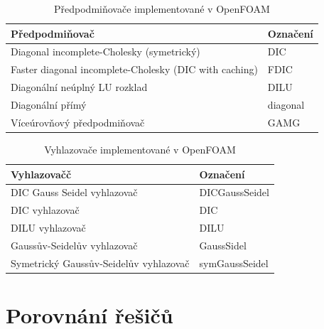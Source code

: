 \documentclass[a4paper,12pt]{report}
\theoremstyle{remark}
\begin{document}
\begin{table}[H]
	\centering
	\caption{Předpodmiňovače implementované v OpenFOAM}
	\renewcommand{\arraystretch}{1.7}
	\begin{tabular}{*2l}
		\toprule
		\textbf{Předpodmiňovač} & \textbf{Označení}\\
		\midrule
		{\small Diagonal incomplete-Cholesky (symetrický)}& DIC\\
		{\small Faster diagonal incomplete-Cholesky (DIC with caching)	}& FDIC \\		
		{\small Diagonální neúplný LU rozklad}& DILU  \\
		{\small Diagonální přímý}& diagonal \\
		{\small Víceúrovňový předpodmiňovač}& GAMG  \\
		\bottomrule
	\end{tabular}
	
	\label{table:preconditioners}
\end{table}

\begin{table}[H]
	\centering
	\caption{Vyhlazovače implementované v OpenFOAM}
	\renewcommand{\arraystretch}{1.7}
	\begin{tabular}{*2l}
		\toprule
		\textbf{Vyhlazovačč} & \textbf{Označení}\\
		\midrule
		{\small DIC Gauss Seidel vyhlazovač}& DICGaussSeidel\\
		{\small DIC vyhlazovač}& DIC\\		
		{\small DILU vyhlazovač}& DILU \\		
		{\small Gaussův-Seidelův vyhlazovač}& GaussSidel  \\
		{\small Symetrický Gaussův-Seidelův vyhlazovač}& symGaussSeidel \\
		\bottomrule
	\end{tabular}
	\label{table:smoothers}
\end{table}

	{\let\clearpage\relax \chapter{Porovnání řešičů}}
	
\end{document}
